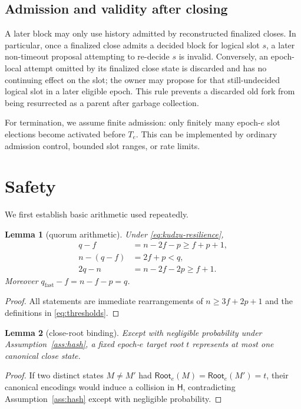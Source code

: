 \documentclass[11pt]{article}
\newtheorem{lemma}{Lemma}
\theoremstyle{remark}
\newcommand{\hash}{\mathsf{H}}
\newcommand{\Root}{\mathsf{Root}}
\begin{document}
\subsection{Admission and validity after closing}

A later block may only use history admitted by reconstructed finalized closes. In particular, once a finalized close admits a decided block for logical slot $s$, a later non-timeout proposal attempting to re-decide $s$ is invalid. Conversely, an epoch-local attempt omitted by its finalized close state is discarded and has no continuing effect on the slot; the owner may propose for that still-undecided logical slot in a later eligible epoch. This rule prevents a discarded old fork from being resurrected as a parent after garbage collection.

For termination, we assume finite admission: only finitely many epoch-$e$ slot elections become activated before $T_e$. This can be implemented by ordinary admission control, bounded slot ranges, or rate limits.

\section{Safety}

We first establish basic arithmetic used repeatedly.

\begin{lemma}[quorum arithmetic]
Under \eqref{eq:kudzu-resilience},
\begin{align}
  q-f &= n-2f-p \ge f+p+1, \label{eq:qminusf}\\
  n-(q-f) &= 2f+p < q, \label{eq:blockclose}\\
  2q-n &= n-2f-2p \ge f+1. \label{eq:qqintersect}
\end{align}
Moreover $q_{\mathrm{fast}}-f=n-f-p=q$.
\end{lemma}

\begin{proof}
All statements are immediate rearrangements of $n\ge 3f+2p+1$ and the definitions in \eqref{eq:thresholds}.
\end{proof}

\begin{lemma}[close-root binding]
\label{lem:root-binding}
Except with negligible probability under Assumption~\ref{ass:hash}, a fixed epoch-$e$ target root $t$ represents at most one canonical close state.
\end{lemma}

\begin{proof}
If two distinct states $M\ne M'$ had $\Root_e(M)=\Root_e(M')=t$, their canonical encodings would induce a collision in $\hash$, contradicting Assumption~\ref{ass:hash} except with negligible probability.
\end{proof}
\end{document}
